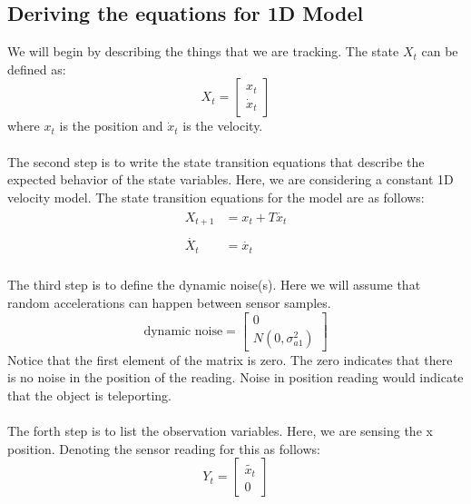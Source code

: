 \documentclass[12pt]{article}
\begin{document}
\subsection{ Deriving the equations for 1D Model}
\label{sec:1D}
We will begin by describing the things that we are tracking. The state $X_t$ can be defined as: 
\begin{equation}
X_t = 
\begin{bmatrix}
	x_t \\
	\dot{x}_t
\end{bmatrix}
\label{eq:1d state}
\end{equation}
where $x_t$ is the position and $\dot{x}_t$ is the velocity. \\
\\
The second step is to write the state transition equations that describe the expected behavior of the state variables. Here, we are considering a constant 1D velocity model. The state transition equations for the model are as follows: 
\begin{align}
\begin{split}
	X_{t+1} &= x_t + T \dot{x_t} \\
	\\
	\dot{X_t} &=  \dot{x_t}
\end{split}
\label{eq:1d state transition}
\end{align}
\\
The third step is to define the dynamic noise(s). Here we will assume that random accelerations can happen between sensor samples. 
\begin{equation}
\text{dynamic noise} = 
\begin{bmatrix}
	0 \\
	N(0,\sigma^2_{a1})
\end{bmatrix}
\label{eq:1d dyn noise}
\end{equation}
Notice that the first element of the matrix is zero. The zero indicates that there is no noise in the position of the reading. Noise in position reading would indicate that the object is teleporting.  \\
\\
The forth step is to list the observation variables. Here, we are sensing the x position. Denoting the sensor reading for this as follows: 
\begin{equation}
Y_t = 
\begin{bmatrix}
	\tilde{x_t} \\
	0
\end{bmatrix}
\label{eq:1d obs var}
\end{equation}
\end{document}
